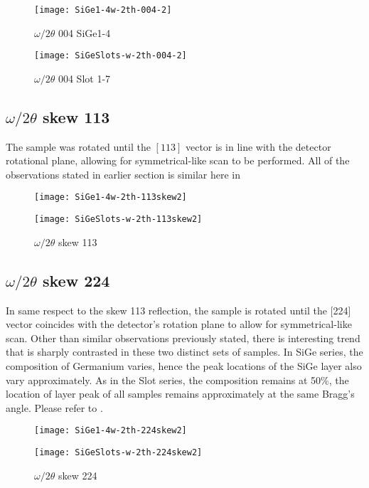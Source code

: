 \begin{figure}[h]
\centering
\caption{$\omega/2\theta$ 004 SiGe1-4}
\label{w2th004}
\texttt{[image: SiGe1-4w-2th-004-2]}
\end{figure}

\begin{figure}[h]
\centering
\caption{$\omega/2\theta$ 004 Slot 1-7}
\label{w2th004-2}
\texttt{[image: SiGeSlots-w-2th-004-2]}
\end{figure}

\subsection{$\omega/2\theta$ skew 113}
The sample was rotated until the $[113]$ vector is in line with the detector rotational plane, allowing for symmetrical-like scan to be performed.  All of the observations stated in earlier section is similar here in 

\begin{figure}%
\caption{$\omega/2\theta$ skew 113}
\label{skew113}
\begin{minipage}{0.85\linewidth}
\texttt{[image: SiGe1-4w-2th-113skew2]}
\end{minipage}
\begin{minipage}{0.85\linewidth}
\texttt{[image: SiGeSlots-w-2th-113skew2]}
\end{minipage}
\end{figure}

\subsection{$\omega/2\theta$ skew 224}
In same respect to the skew 113 reflection, the sample is rotated until the [224] vector coincides with the detector's rotation plane to allow for symmetrical-like scan.  Other than similar observations previously stated, there is interesting trend that is sharply contrasted in these two distinct sets of samples.  In SiGe series, the composition of Germanium varies,  hence the peak locations of the SiGe layer also vary approximately.  As in the Slot series, the composition remains at 50\%, the location of layer peak of all samples remains approximately at the same Bragg's angle.  Please refer to .

\begin{figure}%
\caption{$\omega/2\theta$ skew 224 }
\label{skew224}
\begin{minipage}{0.85\linewidth}
\texttt{[image: SiGe1-4w-2th-224skew2]}
\end{minipage}
\begin{minipage}{0.85\linewidth}
\texttt{[image: SiGeSlots-w-2th-224skew2]}
\end{minipage}
\end{figure}

